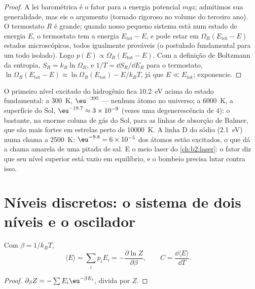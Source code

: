 \begin{proof}
A lei barométrica é o fator para a energia potencial $mgz$; admitimos
sua generalidade, mas eis o argumento (tornado rigoroso no
volume do terceiro ano). O termostato $R$ é grande; quando nosso pequeno sistema está
num estado de energia $E$, o termostato tem a energia $E_{\text{tot}} -
E$, e pode estar em $\Omega_R(E_{\text{tot}} - E)$ estados microscópicos, todos
igualmente prováveis (o postulado fundamental para um todo isolado). Logo
$p(E) \propto \Omega_R(E_{\text{tot}} - E)$. Com a definição de Boltzmann
da entropia, $S_R = k_B\ln\Omega_R$, e $1/T = \dd S_R/\dd E_R$ para o
termostato, $\ln\Omega_R(E_{\text{tot}} - E) \approx \ln\Omega_R(E_{\text{tot}})
- E/k_BT$, já que $E \ll E_{\text{tot}}$; exponencie.
\end{proof}

\begin{example}\label{ex:b2:boltzmann-factor:levels}
O primeiro nível excitado do hidrogênio fica \qty{10.2}{eV} acima do estado
fundamental: a \qty{300}{K}, $\eu^{-395}$ --- nenhum átomo no universo; a
\qty{6000}{K}, a superfície do Sol, $\eu^{-19.7} \approx 3 \times 10^{-9}$ (vezes
uma degenerescência de $4$): o bastante, na enorme coluna de gás do Sol, para as
linhas de absorção de Balmer, que são mais fortes em estrelas perto de \qty{10000}{K}.
A linha D do sódio (\qty{2.1}{eV}) numa chama a \qty{2500}{K}: $\eu^{-9.8} = 6
\times 10^{-5}$ dos átomos estão excitados, o que dá a chama amarela de uma
pitada de sal. E o meio laser do \cref{ch:b2:laser}: o fator
diz que seu nível superior está vazio em equilíbrio, e o bombeio precisa lutar
contra isso.
\end{example}

\section{Níveis discretos: o sistema de dois níveis e o oscilador}

\begin{proposition}\label{prop:b2:boltzmann-factor:meanE}
Com $\beta = 1/k_BT$,
\[
\langle E\rangle = \sum_ip_iE_i = -\frac{\partial\ln Z}{\partial\beta}, \qquad
C = \frac{\dd\langle E\rangle}{\dd T} .
\]
\end{proposition}

\begin{proof}
$\partial_\beta Z = -\sum E_i\eu^{-\beta E_i}$, divida por $Z$.
\end{proof}

